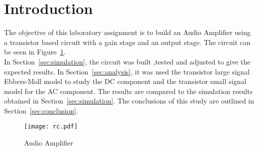 \section{Introduction}
\label{sec:introduction}

\par The objective of this laboratory assignment is to build an Audio Amplifier using a transistor based circuit with a gain stage and an output stage. The circuit can be seen in Figure~\ref{fig:rc}.\\


In Section~\ref{sec:simulation}, the circuit was built ,tested and adjusted to give the expected results.
In Section~\ref{sec:analysis}, it was used the transistor large signal Ebbers-Moll model  to study the DC component and the transistor small signal model for the AC component. The results are compared to the simulation results obtained in Section~\ref{sec:simulation}. The conclusions of this study are outlined in Section~\ref{sec:conclusion}.

\begin{figure}[h] \centering
\texttt{[image: rc.pdf]}
\caption{Audio Amplifier}
\label{fig:rc}
\end{figure}
